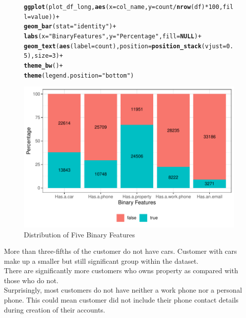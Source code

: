 \documentclass{article}\usepackage[]{graphicx}\usepackage[]{xcolor}
\makeatletter
\def\maxwidth{ %
  \ifdim\Gin@nat@width>\linewidth
    \linewidth
  \else
    \Gin@nat@width
  \fi
}
\newcommand{\hlnum}[1]{\textcolor[rgb]{0.686,0.059,0.569}{#1}}%
\newcommand{\hlsng}[1]{\textcolor[rgb]{0.192,0.494,0.8}{#1}}%
\newcommand{\hlopt}[1]{\textcolor[rgb]{0,0,0}{#1}}%
\newcommand{\hldef}[1]{\textcolor[rgb]{0.345,0.345,0.345}{#1}}%
\newcommand{\hlkwa}[1]{\textcolor[rgb]{0.161,0.373,0.58}{\textbf{#1}}}%
\newcommand{\hlkwc}[1]{\textcolor[rgb]{0.333,0.667,0.333}{#1}}%
\newcommand{\hlkwd}[1]{\textcolor[rgb]{0.737,0.353,0.396}{\textbf{#1}}}%
\newenvironment{kframe}{%
 \def\at@end@of@kframe{}%
 \ifinner\ifhmode%
  \def\at@end@of@kframe{\end{minipage}}%
  \begin{minipage}{\columnwidth}%
 \fi\fi%
 \def\FrameCommand##1{\hskip\@totalleftmargin \hskip-\fboxsep
 \colorbox{shadecolor}{##1}\hskip-\fboxsep
     \hskip-\linewidth \hskip-\@totalleftmargin \hskip\columnwidth}%
 \MakeFramed {\advance\hsize-\width
   \@totalleftmargin\z@ \linewidth\hsize
   \@setminipage}}%
 {\par\unskip\endMakeFramed%
 \at@end@of@kframe}
\newenvironment{knitrout}{}{} %
\makeatother
\begin{document}
\begin{figure}[H]
\begin{knitrout}
\begin{kframe}
\begin{alltt}
\hlkwd{ggplot}\hldef{(plot_df_long,} \hlkwd{aes}\hldef{(}\hlkwc{x} \hldef{= col_name,} \hlkwc{y} \hldef{= count} \hlopt{/} \hlkwd{nrow}\hldef{(df)} \hlopt{*} \hlnum{100}\hldef{,} \hlkwc{fill} \hldef{= value))} \hlopt{+}
  \hlkwd{geom_bar}\hldef{(}\hlkwc{stat} \hldef{=} \hlsng{"identity"}\hldef{)} \hlopt{+}
  \hlkwd{labs}\hldef{(}\hlkwc{x} \hldef{=} \hlsng{"Binary Features"}\hldef{,} \hlkwc{y} \hldef{=} \hlsng{"Percentage"}\hldef{,} \hlkwc{fill} \hldef{=} \hlkwa{NULL}\hldef{)} \hlopt{+}
  \hlkwd{geom_text}\hldef{(}\hlkwd{aes}\hldef{(}\hlkwc{label} \hldef{= count),} \hlkwc{position} \hldef{=} \hlkwd{position_stack}\hldef{(}\hlkwc{vjust} \hldef{=} \hlnum{0.5}\hldef{),} \hlkwc{size} \hldef{=} \hlnum{3}\hldef{)} \hlopt{+}
  \hlkwd{theme_bw}\hldef{()} \hlopt{+}
  \hlkwd{theme}\hldef{(}\hlkwc{legend.position} \hldef{=} \hlsng{"bottom"}\hldef{)}
\end{alltt}
\end{kframe}
\includegraphics[width=\maxwidth]{figure/unnamed-chunk-28-1} 
\end{knitrout}
\caption{Distribution of Five Binary Features}
\end{figure}

More than three-fifths of the customer do not have cars. Customer with cars make up a smaller but still significant group within the dataset. \\

There are significantly more customers who owns property as compared with those who do not. \\

Surprisingly, most customers do not have neither a work phone nor a personal phone. This could mean customer did not include their phone contact details during creation of their accounts. \\
\end{document}
